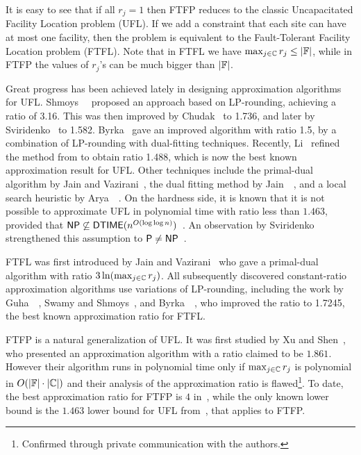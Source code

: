 \documentclass{llncs}
\begin{document}
It is easy to see that if all $r_j=1$ then FTFP reduces to
the classic Uncapacitated Facility Location problem (UFL).
If we add a constraint that each site can have at most one
facility, then the problem is equivalent to the Fault-Tolerant Facility
Location problem (FTFL). Note that
in FTFL we have $\max_{j\in\mathbb{C}}r_j \leq |\mathbb{F}|$, 
while in FTFP the values of $r_j$'s can be much bigger than $|\mathbb{F}|$.

Great progress has been achieved lately in designing
approximation algorithms for UFL.
Shmoys~\etal~\cite{ShmoysTA97} proposed an approach based on
LP-rounding, achieving a ratio of 3.16.  This was then
improved by Chudak~\cite{ChudakS04} to 1.736, and later by
Sviridenko~\cite{Svi02} to 1.582.  Byrka~\cite{ByrkaA10}
gave an improved algorithm with ratio 1.5, by a combination of
LP-rounding with dual-fitting techniques.  Recently, Li~\cite{Li11} refined
the method from \cite{ByrkaA10} to obtain ratio 1.488, which is now
the best known approximation result for UFL. Other
techniques include the primal-dual algorithm by Jain and
Vazirani~\cite{JainV01}, the dual fitting method by
Jain~{\etal}~\cite{JainMMSV03}, and a local search heuristic
by Arya~{\etal}~\cite{AryaGKMMP04}.  On the hardness side,
it is known that it is not possible to approximate UFL in
polynomial time with ratio less than $1.463$, provided that
${\mbox{\sf NP}}\not\subseteq{\mbox{\sf DTIME}}(n^{O(\log\log
  n)})$~\cite{GuhaK98}. An observation by Sviridenko
strengthened this assumption to ${\mbox{\sf P}}\neq
{\mbox{\sf NP}}$~\cite{vygen05}.

FTFL was first introduced by Jain and
Vazirani~\cite{JainV03} who gave a primal-dual algorithm
with ratio $3\ln(\max_{j\in\mathbb{C}}r_j)$.  All
subsequently discovered constant-ratio approximation
algorithms use variations of LP-rounding, including the work
by Guha~{\etal}~\cite{GuhaMM01}, Swamy and
Shmoys~\cite{SwamyS08}, and Byrka~{\etal}~\cite{ByrkaSS10},
who improved the ratio to 1.7245, the best known
approximation ratio for FTFL.

FTFP is a natural generalization of UFL. It was first
studied by Xu and Shen~\cite{XuS09}, who presented an
approximation algorithm with a ratio claimed to be
$1.861$. However their algorithm runs in polynomial time
only if $\max_{j\in\mathbb{C}} r_j$ is polynomial in
$O(|\mathbb{F}|\cdot |\mathbb{C}|)$ and their analysis of the
approximation ratio is flawed\footnote{Confirmed through
  private communication with the authors.}.  To date, the
best approximation ratio for FTFP is $4$ in~\cite{YanC11}, 
while the only known lower bound is the $1.463$ lower bound for UFL
from~\cite{GuhaK98}, that applies to FTFP.
\end{document}

